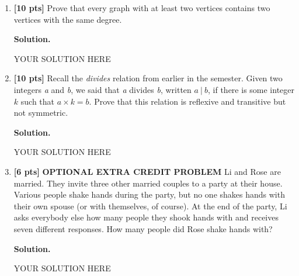 \documentclass[11pt]{article}
\newcommand{\sol}{\bigskip\textbf{Solution.}\qquad\qquad}
\newcommand{\points}[1]{\textbf{[#1 pts]}}
\begin{document}
\begin{enumerate}
\item \points{10} 
Prove that every graph with at least two vertices contains two vertices with the same degree.

\sol

YOUR SOLUTION HERE

\bigskip

\bigskip


\item \points{10} 
Recall the \textit{divides} relation from earlier in the semester. Given two integers \textit{a} and \textit{b}, we said that \textit{a} divides \textit{b}, written $a~ | ~b$, if there is some integer $k$ such that $a \times k = b$. Prove that this relation is reflexive and transitive but not symmetric.

\sol

YOUR SOLUTION HERE

\bigskip

\bigskip


\item \points{6} \textbf{OPTIONAL EXTRA CREDIT PROBLEM}
Li and Rose are married. They invite three other married couples to a party at their house. Various people shake hands during the party, but no one shakes hands with their own spouse (or with themselves, of course). At the end of the party, Li asks everybody else how many people they shook hands with and receives seven different responses. How many people did Rose shake hands with?

\sol

YOUR SOLUTION HERE

\bigskip

\bigskip


\end{enumerate}
\end{document}
